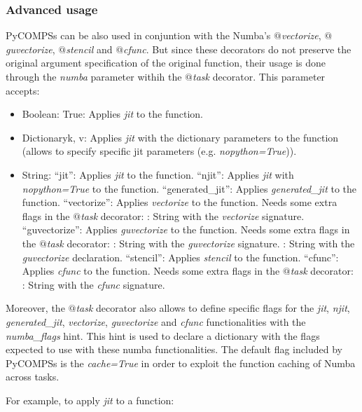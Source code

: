 \subsubsection{Advanced usage}

PyCOMPSs can be also used in conjuntion with the Numba's {\it $@$vectorize}, {\it $@$guvectorize}, {\it $@$stencil} and {\it $@$cfunc}. But since these decorators do not preserve
the original argument specification of the original function, their usage is done through the {\it numba} parameter withih the {\it $@$task} decorator.
This parameter accepts:
\begin{itemize}
 \item Boolean: True: Applies {\it jit} to the function.
 \item Dictionary{k, v}: Applies {\it jit} with the dictionary parameters to the function (allows to specify specific jit parameters (e.g. {\it nopython=True})).
 \item String:
   \subitem ``jit'': Applies {\it jit} to the function.
   \subitem ``njit'': Applies {\it jit} with {\it nopython=True} to the function.
   \subitem ``generated\_jit'': Applies {\it generated\_jit} to the function.
   \subitem ``vectorize'': Applies {\it vectorize} to the function.
     \subsubitem Needs some extra flags in the {\it $@$task} decorator:
     : String with the {\it vectorize} signature.
   \subitem ``guvectorize'': Applies {\it guvectorize} to the function.
     \subsubitem Needs some extra flags in the {\it $@$task} decorator:
     : String with the {\it guvectorize} signature.
     : String with the {\it guvectorize} declaration.
   \subitem ``stencil'': Applies {\it stencil} to the function.
   \subitem ``cfunc'': Applies {\it cfunc} to the function.
     \subsubitem Needs some extra flags in the {\it $@$task} decorator:
     : String with the {\it cfunc} signature.
\end{itemize}
Moreover, the {\it $@$task} decorator also allows to define specific flags for the {\it jit}, {\it njit}, {\it generated\_jit}, {\it vectorize}, {\it guvectorize} and {\it cfunc} functionalities with the {\it numba\_flags} hint. This hint is used to declare a dictionary with the flags expected to use with these numba functionalities.
The default flag included by PyCOMPSs is the {\it cache=True} in order to exploit the function caching of Numba across tasks.

For example, to apply {\it jit} to a function:

